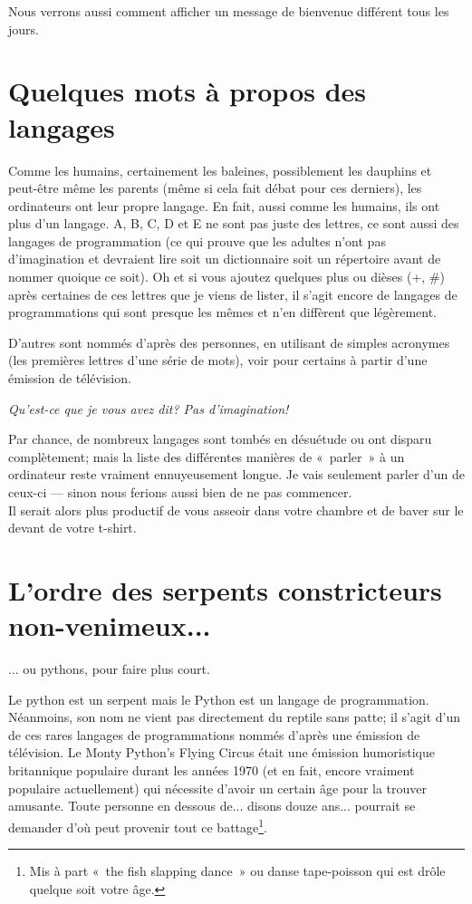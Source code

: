 Nous verrons aussi comment afficher un message de bienvenue différent tous les jours.

\section{Quelques mots à propos des langages}
Comme les humains, certainement les baleines, possiblement les dauphins et peut-être même les parents (même si cela fait débat pour ces derniers), les ordinateurs ont leur propre langage. En fait, aussi comme les humains, ils ont plus d'un langage. A, B, C, D et E ne sont pas juste des lettres, ce sont aussi des langages de programmation (ce qui prouve que les adultes n'ont pas d'imagination et devraient lire soit un dictionnaire soit un répertoire avant de nommer quoique ce soit). Oh et si vous ajoutez quelques plus ou dièses (+, \#) après certaines de ces lettres que je viens de lister, il s'agit encore de langages de programmations qui sont presque les mêmes et n'en diffèrent que légèrement.

D'autres sont nommés d'après des personnes, en utilisant de simples acronymes (les premières lettres d'une série de mots), voir pour certains à partir d'une émission de télévision. 

\bigskip
\emph{Qu'est-ce que je vous avez dit? Pas d'imagination!}

\bigskip
Par chance, de nombreux langages sont tombés en désuétude ou ont disparu complètement; mais la liste des différentes manières de «~parler~» à un ordinateur reste vraiment ennuyeusement longue. Je vais seulement parler d'un de ceux-ci --- sinon nous ferions aussi bien de ne pas commencer.\\


Il serait alors plus productif de vous asseoir dans votre chambre et de baver sur le devant de votre t-shirt.

\section{L'ordre des serpents constricteurs non-venimeux...}
... ou pythons, pour faire plus court.

\bigskip
Le python est un serpent mais le Python est un langage de programmation. Néanmoins, son nom ne vient pas directement du reptile sans patte; il s'agit d'un de ces rares langages de programmations nommés d'après une émission de télévision. Le Monty Python's Flying Circus était une émission humoristique britannique populaire durant les années 1970 (et en fait, encore vraiment populaire actuellement) qui nécessite d'avoir un certain âge pour la trouver amusante. Toute personne en dessous de... disons douze ans... pourrait se demander d'où peut provenir tout ce battage\footnote{Mis à part «~the fish slapping dance~» ou danse tape-poisson qui est drôle quelque soit votre âge.}.

